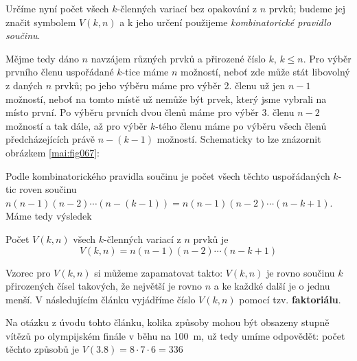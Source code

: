     Určíme nyní počet všech \(k\)-členných variací bez opakování z \(n\) prvků; budeme jej značit
    symbolem \(V(k,n)\) a k jeho určení použijeme \emph{kombinatorické pravidlo součinu}.

    Mějme tedy dáno \(n\) navzájem různých prvků a přirozené číslo \(k\), \(k\leq n\). Pro výběr
    prvního členu uspořádané \(k\)-tice máme \(n\) možností, neboť zde může stát libovolný z daných
    \(n\) prvků; po jeho výběru máme pro výběr 2. členu už jen \(n - 1\) možností, neboť na tomto
    místě už nemůže být prvek, který jsme vybrali na místo první. Po výběru prvních dvou členů máme
    pro výběr 3. členu \(n - 2\) možností a tak dále, až pro výběr \(k\)-tého členu máme po výběru
    všech členů předcházejících právě \(n - (k - 1)\) možností. Schematicky to lze znázornit
    obrázkem \ref{mai:fig067}:


    Podle kombinatorického pravidla součinu je počet všech těchto uspořádaných \(k\)-tic roven
    součinu \(n(n-1)(n-2)\cdots(n-(k-1)) = n(n-1)(n-2)\cdots(n - k + 1)\). Máme tedy výsledek

    \begin{mdframed}[style=highlight] Počet \(V(k,n)\) všech \(k\)-členných variací z \(n\) prvků je
      \begin{equation*}
        V(k,n) = n(n-1)(n-2)\cdots(n - k + 1)
      \end{equation*}
    \end{mdframed} 

    Vzorec pro \(V(k,n)\) si můžeme zapamatovat takto: \(V(k,n)\) je rovno součinu \(k\) přirozených
    čísel takových, že největší je rovno \(n\) a ke každké další je o jednu menší. V následujícím
    článku vyjádříme číslo \(V(k,n)\) pomocí tzv. \textbf{faktoriálu}. 

    Na otázku z úvodu tohto článku, kolika způsoby mohou být obsazeny stupně vítězů po olympijském
    finále v běhu na \qty{100}{\meter}, už tedy umíme odpovědět: počet těchto způsobů je \(V(3.8) =
    8\cdot7\cdot6=336\)

    
  
